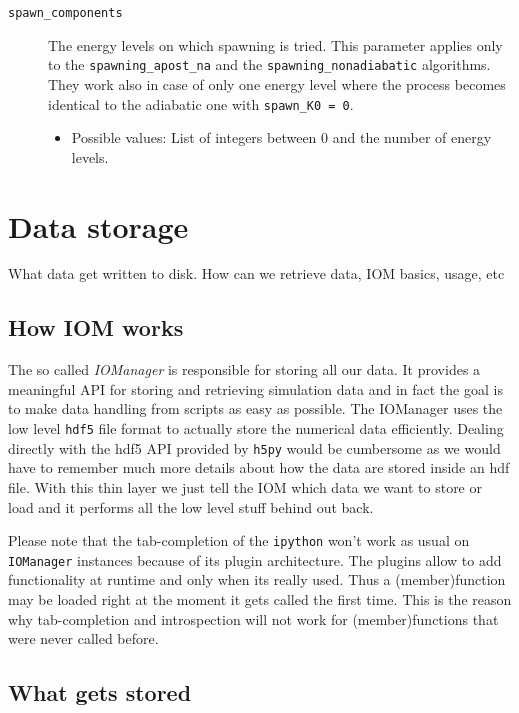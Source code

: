 \documentclass[a4paper,10pt]{report}
\begin{document}
\begin{description}
  \item[\texttt{spawn\_components}] The energy levels on which spawning is tried.
  This parameter applies only to the \texttt{spawning\_apost\_na} and the
  \texttt{spawning\_nonadiabatic} algorithms. They work also in case
  of only one energy level where the process becomes identical to the adiabatic one
  with \texttt{spawn\_K0 = 0}.
  \begin{itemize}
    \item Possible values: List of integers between 0 and the number of energy levels.
  \end{itemize}

\end{description}


\section{Data storage}

What data get written to disk. How can we retrieve data, IOM basics, usage, etc

\subsection{How IOM works}

The so called \emph{IOManager} is responsible for storing all our data. It provides a
meaningful API for storing and retrieving simulation data and in fact the goal is to
make data handling from scripts as easy as possible. The IOManager uses the low level
\texttt{hdf5} file format to actually store the numerical data efficiently. Dealing directly
with the hdf5 API provided by \texttt{h5py} would be cumbersome as we would have
to remember much more details about how the data are stored inside an hdf file. With this thin
layer we just tell the IOM which data we want to store or load and it performs
all the low level stuff behind out back.

Please note that the tab-completion of the \texttt{ipython} won't work as usual
on \texttt{IOManager} instances because of its plugin architecture. The plugins
allow to add functionality at runtime and only when its really used. Thus a
(member)function may be loaded right at the moment it gets called the first time.
This is the reason why tab-completion and introspection will not work for
(member)functions that were never called before.

\subsection{What gets stored}
\end{document}
